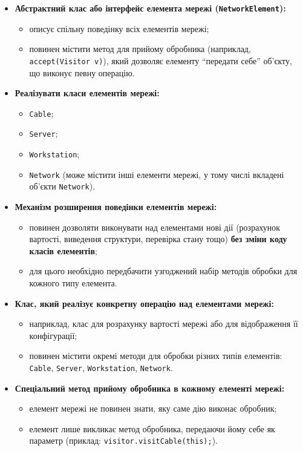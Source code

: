 \documentclass[12pt,a4paper]{article}
\begin{document}
    \begin{itemize}
        \item \textbf{Абстрактний клас або інтерфейс елемента мережі (\texttt{NetworkElement}):}
        \begin{itemize}
            \item описує спільну поведінку всіх елементів мережі;
            \item повинен містити метод для прийому обробника (наприклад, \texttt{accept(Visitor v)}), який дозволяє елементу ``передати себе'' об'єкту, що виконує певну операцію.
        \end{itemize}

        \item \textbf{Реалізувати класи елементів мережі:}
        \begin{itemize}
            \item \texttt{Cable};
            \item \texttt{Server};
            \item \texttt{Workstation};
            \item \texttt{Network} (може містити інші елементи мережі, у тому числі вкладені об’єкти \texttt{Network}).
        \end{itemize}

        \item \textbf{Механізм розширення поведінки елементів мережі:}
        \begin{itemize}
            \item повинен дозволяти виконувати над елементами нові дії (розрахунок вартості, виведення структури, перевірка стану тощо) \textbf{без зміни коду класів елементів};
            \item для цього необхідно передбачити узгоджений набір методів обробки для кожного типу елемента.
        \end{itemize}

        \item \textbf{Клас, який реалізує конкретну операцію над елементами мережі:}
        \begin{itemize}
            \item наприклад, клас для розрахунку вартості мережі або для відображення її конфігурації;
            \item повинен містити окремі методи для обробки різних типів елементів: \texttt{Cable}, \texttt{Server}, \texttt{Workstation}, \texttt{Network}.
        \end{itemize}

        \item \textbf{Спеціальний метод прийому обробника в кожному елементі мережі:}
        \begin{itemize}
            \item елемент мережі не повинен знати, яку саме дію виконає обробник;
            \item елемент лише викликає метод обробника, передаючи йому себе як параметр (приклад: \texttt{visitor.visitCable(this);}).
        \end{itemize}
    \end{itemize}
\end{document}
